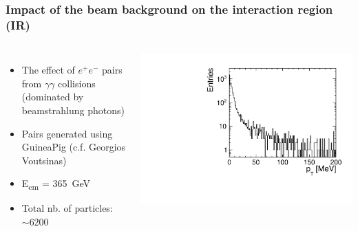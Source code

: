 \documentclass[aspectratio=169, hyperref={colorlinks=true,pdfpagelabels=false,linkcolor=black}, xcolor=dvipsnames,10pt]{beamer}
\begin{document}
\begin{frame}
	\frametitle{Impact of the beam background on the interaction region (IR)}

	\begin{columns}
	\begin{itemize}
	\item The effect of $e^{+}e^{-}$ pairs from $\gamma\gamma$ collisions (dominated by beamstrahlung photons)
	\item Pairs generated using GuineaPig (c.f. Georgios Voutsinas)
	\item E\textsubscript{cm} = 365~GeV
	\item Total nb. of particles: $\sim6200$
	\end{itemize}		
		\centering
		\includegraphics[width=\textwidth]{../figures/incoherentPairs_pT.pdf} 
	\end{columns}	
	

\end{frame}
\end{document}
